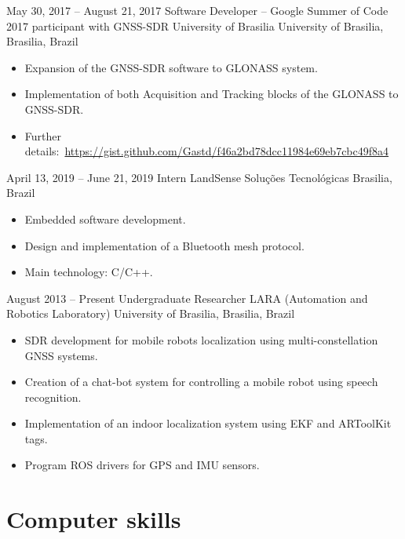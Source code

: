 \documentclass[a4paper, 10pt]{moderncv}        %
\begin{document}
\cventry
{May 30, 2017 -- August 21, 2017}
{Software Developer -- Google Summer of Code 2017 participant with GNSS-SDR}
{University of Brasilia}
{University of Brasilia, Brasilia, Brazil}
{}
{\begin{itemize}%
    \item Expansion of the GNSS-SDR software to GLONASS system.
    \item Implementation of both Acquisition and Tracking blocks of the GLONASS to GNSS-SDR.
    \item Further details:~\url{https://gist.github.com/Gastd/f46a2bd78dcc11984e69eb7cbc49f8a4}
    \end{itemize}}
\cventry
{April 13, 2019 -- June 21, 2019}
{Intern}
{LandSense Soluções Tecnológicas}
{Brasilia, Brazil}
{}
{\begin{itemize}%
    \item Embedded software development.
    \item Design and implementation of a Bluetooth mesh protocol.
    \item Main technology: C/C++.
    \end{itemize}}
\cventry
{August 2013 -- Present}
{Undergraduate Researcher}
{LARA (Automation and Robotics Laboratory)}
{University of Brasilia, Brasilia, Brazil}
{}
{\begin{itemize}%
    \item SDR development for mobile robots localization using multi-constellation GNSS systems.
    \item Creation of a \textquotedbl{}chat-bot\textquotedbl{} system for controlling a mobile robot using speech recognition.
    \item Implementation of an indoor localization system using EKF and ARToolKit tags.
    \item Program ROS drivers for GPS and IMU sensors.
    \end{itemize}}

\section{Computer skills}
\end{document}
